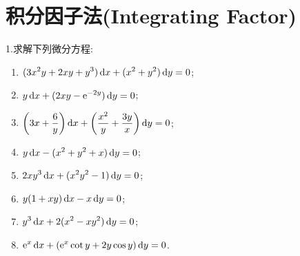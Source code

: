 \section{积分因子法(Integrating Factor)}
1.求解下列微分方程:
\begin{enumerate}[(1)]
\item $\displaystyle(3x^2y+2xy+y^3)\mathop{}\!\mathrm{d} x+(x^2+y^2)\mathop{}\!\mathrm{d} y=0$;
\item $\displaystyle y\mathop{}\!\mathrm{d} x+(2xy-\mathrm{e}^{-2y})\mathop{}\!\mathrm{d} y=0$;
\item $\displaystyle\left(3x+\frac{6}{y}\right)\mathop{}\!\mathrm{d} x+\left(\frac{x^2}{y}+\frac{3y}{x}\right)\mathop{}\!\mathrm{d} y=0$;
\item $\displaystyle y\mathop{}\!\mathrm{d} x-(x^2+y^2+x)\mathop{}\!\mathrm{d} y=0$;
\item $\displaystyle 2xy^3\mathop{}\!\mathrm{d} x+(x^2y^2-1)\mathop{}\!\mathrm{d} y=0$;
\item $\displaystyle y(1+xy)\mathop{}\!\mathrm{d} x-x\mathop{}\!\mathrm{d} y=0$;
\item $\displaystyle y^3\mathop{}\!\mathrm{d} x+2(x^2-xy^2)\mathop{}\!\mathrm{d} y=0$;
\item $\displaystyle\mathrm{e}^x\mathop{}\!\mathrm{d} x+(\mathrm{e}^x\cot y+2y\cos y)\mathop{}\!\mathrm{d} y=0$.
\end{enumerate}

